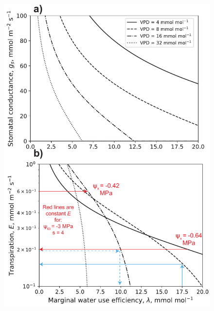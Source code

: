 \documentclass[utf8]{frontiersSCNS} %
\begin{document}
\begin{figure}[h]
    \begin{center}
         \includegraphics[scale=0.5]{g_E_lam_noon.pdf}   
    \end{center}

\end{figure}
\end{document}
